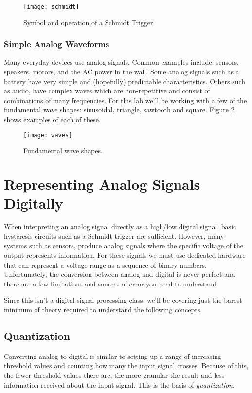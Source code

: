 \documentclass[openany,11pt,fleqn]{book} %
\begin{document}
\begin{figure}[]
    \centering\texttt{[image: schmidt]}
    \caption{Symbol and operation of a Schmidt Trigger.}
    \label{schmidt}
\end{figure}

\subsubsection{Simple Analog Waveforms}
Many everyday devices use analog signals. Common examples include: sensors, speakers, motors, and the AC power in the wall. Some analog signals such as a battery have very simple and (hopefully) predictable characteristics. Others such as audio, have complex waves which are non-repetitive and consist of combinations of many frequencies. For this lab we'll be working with a few of the fundamental wave shapes: sinusoidal, triangle, sawtooth and square. Figure \ref{waves} shows examples of each of these. 

\begin{figure}[]
    \centering\texttt{[image: waves]}
    \caption{Fundamental wave shapes.}
    \label{waves}
\end{figure}


\section{Representing Analog Signals Digitally}
When interpreting an analog signal directly as a high/low digital signal, basic hysteresis circuits such as a Schmidt trigger are sufficient. However, many systems such as sensors, produce analog signals where the specific voltage of the output represents information. For these signals we must use dedicated hardware that can represent a voltage range as a sequence of binary numbers. Unfortunately, the conversion between analog and digital is never perfect and there are a few limitations and sources of error you need to understand. 

Since this isn't a digital signal processing class, we'll be covering just the barest minimum of theory required to understand the following concepts.

\subsection{Quantization}
Converting analog to digital is similar to setting up a range of increasing threshold values and counting how many the input signal crosses. Because of this, the fewer threshold values there are, the more granular the result and less information received about the input signal. This is the basis of \textit{quantization}.
\end{document}
